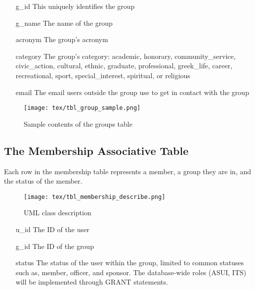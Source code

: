 \documentclass[12pt, twoside, letterpaper]{report}
\begin{document}
\begin{itemize}
\item[g\_id] This uniquely identifies the group
\item[g\_name] The name of the group
\item[acronym] The group's acronym
\item[category] The group's category: academic, honorary,
     community\_service, civic\_action, cultural, ethnic,
     graduate, professional, greek\_life, career,
     recreational, sport, special\_interest, spiritual, or
     religious
\item[email] The email users outside the group use to get
     in contact with the group
\end{itemize}
\begin{figure}[h]
\begin{center}
\caption{Sample contents of the groups table}
\texttt{[image: tex/tbl\_group\_sample.png]}
\end{center}
\end{figure}
\pagebreak
\subsection{The Membership Associative Table}
Each row in the membership table represents a member, a
group they are in, and the status of the member.\\
\begin{wrapfigure}[6]{r}{2.5in}
\begin{center}
\caption{UML class description}
\texttt{[image: tex/tbl\_membership\_describe.png]}
\end{center}
\end{wrapfigure}
\begin{itemize}
\item[u\_id] The ID of the user
\item[g\_id] The ID of the group
\item[status] The status of the user within the group,
     limited to common statuses such as, member, officer,
     and sponsor.  The database-wide roles (ASUI, ITS) will
     be implemented through GRANT statements.
\end{itemize}
\end{document}
